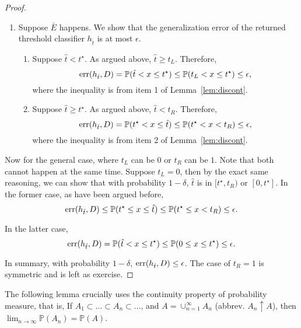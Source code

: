 \documentclass{article}
\DeclareMathOperator*{\err}{{\rm err}}
\newcommand{\PP}{\mathbb{P}}
\begin{document}
\begin{proof}
\begin{enumerate}
    \item Suppose $\bar{E}$ happens.
    We show that the generalization error of the returned threshold classifier $h_{\hat{t}}$ is at most $\epsilon$.
    \begin{enumerate}
      \item Suppose $\hat{t} < t^\star$. As argued above, $\hat{t} \geq t_L$. Therefore,
      \[ \err(h_{\hat{t}}, D) = \PP(\hat{t} < x \leq t^\star) \leq \PP(t_L < x \leq t^\star) \leq \epsilon, \]
      where the inequality is from item 1 of Lemma~\ref{lem:discont}.

      \item Suppose $\hat{t} \geq t^\star$. As argued above, $\hat{t} < t_R$. Therefore,
      \[ \err(h_{\hat{t}}, D) = \PP(t^\star < x \leq \hat{t}) \leq \PP(t^\star < x < t_R) \leq \epsilon, \]
      where the inequality is from item 2 of Lemma~\ref{lem:discont}.
    \end{enumerate}
  \end{enumerate}


  Now for the general case, where $t_L$ can be $0$ or $t_R$ can be $1$. Note that both cannot happen at the same time.
  Suppose $t_L = 0$, then by the exact same reasoning, we can show that with probability $1-\delta$, $\hat{t}$ is in $[t^\star, t_R)$ or $[0,t^\star]$. In the former case, as have been argued before,
  \[ \err(h_{\hat{t}}, D) \leq \PP(t^\star \leq x \leq \hat{t}) \leq \PP(t^\star \leq x < t_R) \leq \epsilon. \]

  In the latter case,
  \[ \err(h_{\hat{t}}, D) = \PP(\hat{t} < x \leq t^\star) \leq \PP(0 \leq x \leq t^\star) \leq \epsilon. \]

  In summary, with probability $1-\delta$, $\err(h_{\hat{t}}, D) \leq \epsilon$. The case of $t_R = 1$ is symmetric and is left as exercise.
\end{proof}

The following lemma crucially uses the continuity property of probability measure, that is,
If $A_1 \subset \ldots \subset A_n \subset \ldots$, and $A = \cup_{n=1}^{\infty} A_n$ (abbrev. $A_n \uparrow A$), then $\lim_{n \to \infty} \PP(A_n) = \PP(A)$.
\end{document}
